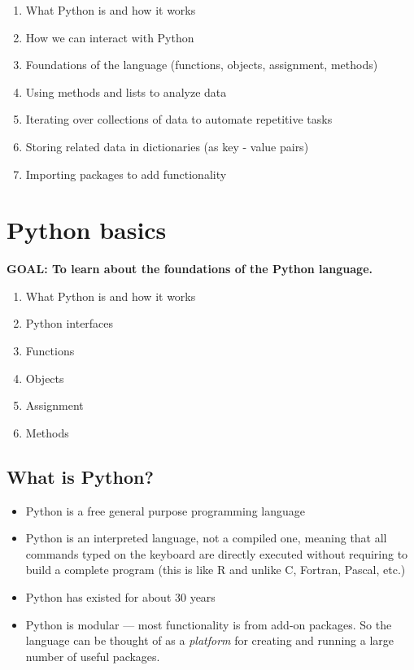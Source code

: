 \documentclass[]{book}
\providecommand{\tightlist}{%
  \setlength{\itemsep}{0pt}\setlength{\parskip}{0pt}}
\begin{document}
\begin{enumerate}
\def\labelenumi{\arabic{enumi}.}
\tightlist
\item
  What Python is and how it works
\item
  How we can interact with Python
\item
  Foundations of the language (functions, objects, assignment, methods)
\item
  Using methods and lists to analyze data
\item
  Iterating over collections of data to automate repetitive tasks
\item
  Storing related data in dictionaries (as key - value pairs)
\item
  Importing packages to add functionality
\end{enumerate}

\hypertarget{python-basics}{%
\section{Python basics}\label{python-basics}}

\textbf{GOAL: To learn about the foundations of the Python language.}

\begin{enumerate}
\def\labelenumi{\arabic{enumi}.}
\tightlist
\item
  What Python is and how it works
\item
  Python interfaces
\item
  Functions
\item
  Objects
\item
  Assignment
\item
  Methods
\end{enumerate}

\hypertarget{what-is-python}{%
\subsection{What is Python?}\label{what-is-python}}

\begin{itemize}
\tightlist
\item
  Python is a free general purpose programming language
\item
  Python is an interpreted language, not a compiled one, meaning that all commands
  typed on the keyboard are directly executed without requiring to build a complete
  program (this is like R and unlike C, Fortran, Pascal, etc.)
\item
  Python has existed for about 30 years
\item
  Python is modular --- most functionality is from add-on packages. So the language can
  be thought of as a \emph{platform} for creating and running a large number of useful packages.
\end{itemize}
\end{document}
